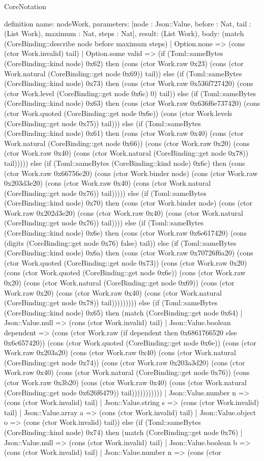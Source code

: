 \begin{lexlean}{CoreNotation}
\begin{semanticmodule}
definition{
 name: nodeWork,
 parameters: [node : Json::Value, before : Nat, tail : (List Work), maximum : Nat, steps : Nat],
 result: (List Work),
 body: (match (CoreBinding::describe node before maximum steps) | Option.none => (cons (ctor Work.invalid) tail) | Option.some valid => (if (Toml::sameBytes (CoreBinding::kind node) 0x62) then (cons (ctor Work.raw 0x23) (cons (ctor Work.natural (CoreBinding::get node 0x69)) tail)) else (if (Toml::sameBytes (CoreBinding::kind node) 0x73) then (cons (ctor Work.raw 0x536f727420) (cons (ctor Work.level (CoreBinding::get node 0x6c) 0) tail)) else (if (Toml::sameBytes (CoreBinding::kind node) 0x63) then (cons (ctor Work.raw 0x636f6e737420) (cons (ctor Work.quoted (CoreBinding::get node 0x6e)) (cons (ctor Work.levels (CoreBinding::get node 0x75)) tail))) else (if (Toml::sameBytes (CoreBinding::kind node) 0x61) then (cons (ctor Work.raw 0x40) (cons (ctor Work.natural (CoreBinding::get node 0x66)) (cons (ctor Work.raw 0x20) (cons (ctor Work.raw 0x40) (cons (ctor Work.natural (CoreBinding::get node 0x78)) tail))))) else (if (Toml::sameBytes (CoreBinding::kind node) 0x6c) then (cons (ctor Work.raw 0x66756e20) (cons (ctor Work.binder node) (cons (ctor Work.raw 0x203d3e20) (cons (ctor Work.raw 0x40) (cons (ctor Work.natural (CoreBinding::get node 0x76)) tail))))) else (if (Toml::sameBytes (CoreBinding::kind node) 0x70) then (cons (ctor Work.binder node) (cons (ctor Work.raw 0x202d3e20) (cons (ctor Work.raw 0x40) (cons (ctor Work.natural (CoreBinding::get node 0x76)) tail)))) else (if (Toml::sameBytes (CoreBinding::kind node) 0x6e) then (cons (ctor Work.raw 0x6e617420) (cons (digits (CoreBinding::get node 0x76) false) tail)) else (if (Toml::sameBytes (CoreBinding::kind node) 0x6a) then (cons (ctor Work.raw 0x70726f6a20) (cons (ctor Work.quoted (CoreBinding::get node 0x73)) (cons (ctor Work.raw 0x20) (cons (ctor Work.quoted (CoreBinding::get node 0x6e)) (cons (ctor Work.raw 0x20) (cons (ctor Work.natural (CoreBinding::get node 0x69)) (cons (ctor Work.raw 0x20) (cons (ctor Work.raw 0x40) (cons (ctor Work.natural (CoreBinding::get node 0x78)) tail))))))))) else (if (Toml::sameBytes (CoreBinding::kind node) 0x65) then (match (CoreBinding::get node 0x64) | Json::Value.null => (cons (ctor Work.invalid) tail) | Json::Value.boolean dependent => (cons (ctor Work.raw (if dependent then 0x6861766520 else 0x6c657420)) (cons (ctor Work.quoted (CoreBinding::get node 0x6e)) (cons (ctor Work.raw 0x203a20) (cons (ctor Work.raw 0x40) (cons (ctor Work.natural (CoreBinding::get node 0x74)) (cons (ctor Work.raw 0x203a3d20) (cons (ctor Work.raw 0x40) (cons (ctor Work.natural (CoreBinding::get node 0x76)) (cons (ctor Work.raw 0x3b20) (cons (ctor Work.raw 0x40) (cons (ctor Work.natural (CoreBinding::get node 0x626f6479)) tail))))))))))) | Json::Value.number n => (cons (ctor Work.invalid) tail) | Json::Value.string s => (cons (ctor Work.invalid) tail) | Json::Value.array a => (cons (ctor Work.invalid) tail) | Json::Value.object o => (cons (ctor Work.invalid) tail)) else (if (Toml::sameBytes (CoreBinding::kind node) 0x74) then (match (CoreBinding::get node 0x76) | Json::Value.null => (cons (ctor Work.invalid) tail) | Json::Value.boolean b => (cons (ctor Work.invalid) tail) | Json::Value.number n => (cons (ctor }
\end{semanticmodule}
\end{lexlean}
